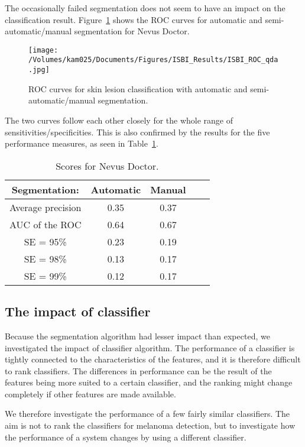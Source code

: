 \documentclass[a4paper,12pt]{article}
\begin{document}
The occasionally failed segmentation does not seem to have an impact on the classification result.
Figure~\ref{fig:ROC} shows the ROC curves for automatic and semi-automatic/manual segmentation for Nevus Doctor. 
  \begin{figure}[h!]
     \texttt{[image: /Volumes/kam025/Documents/Figures/ISBI\_Results/ISBI\_ROC\_qda.jpg]}
      \caption{ROC curves for skin lesion classification with automatic and semi-automatic/manual segmentation.}
       \label{fig:ROC}
   \end{figure}
The two curves follow each other closely for the whole range of sensitivities/specificities. 
This is also confirmed by the results for the five performance measures, as seen in Table~\ref{tab:ND_Rankings}.    
\begin{table}[h!]
\begin{tabular}{c | c | c | c | c}
        Segmentation: &{Automatic} & {Manual} \\
        \hline
  Average precision & 0.35 & 0.37 \\
  AUC of the ROC & 0.64 & 0.67 \\
  SE = 95\% & 0.23 & 0.19 \\
  SE = 98\%  & 0.13 & 0.17 \\
  SE = 99\%  & 0.12  & 0.17
\end{tabular}
  \caption{Scores for Nevus Doctor.}
  \label{tab:ND_Rankings}
\end{table}

\subsection{The impact of classifier} 

Because the segmentation algorithm had lesser impact than expected, we investigated the impact of classifier algorithm.
The performance of a classifier is tightly connected to the characteristics of the features, and it is therefore difficult to rank classifiers.
The differences in performance can be the result of the features being more suited to a certain classifier, and the ranking might change completely if other features are made available. 

We therefore investigate the performance of a few fairly similar classifiers. 
The aim is not to rank the classifiers for melanoma detection, but to investigate how the performance of a system changes by using a different classifier. 
\end{document}
